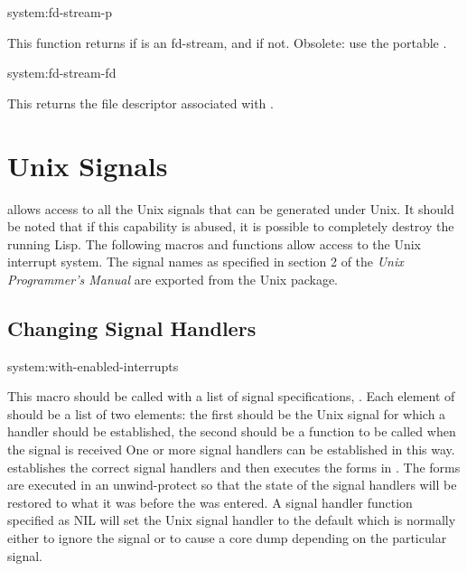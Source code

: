 \begin{defun}{system:}{fd-stream-p}{}
  
  This function returns \true{} if  is an fd-stream, and
  \nil{} if not.  Obsolete: use the portable .
\end{defun}

\begin{defun}{system:}{fd-stream-fd}{}
  
  This returns the file descriptor associated with .
\end{defun}


\section{Unix Signals}
 

\cmucl{} allows access to all the Unix signals that can be generated
under Unix.  It should be noted that if this capability is abused, it is
possible to completely destroy the running Lisp.  The following macros and
functions allow access to the Unix interrupt system.  The signal names as
specified in section 2 of the {\em Unix Programmer's Manual} are exported
from the Unix package.

\subsection{Changing Signal Handlers}
\label{signal-handlers}

\begin{defmac}{system:}{with-enabled-interrupts}{
    }
  
  This macro should be called with a list of signal specifications,
  .  Each element of  should be a list of
  two elements: the first should be the Unix signal
  for which a handler should be established, the second should be a
  function to be called when the signal is received  One or more signal handlers can be
  established in this way.   establishes
  the correct signal handlers and then executes the forms in
  .  The forms are executed in an unwind-protect so that the
  state of the signal handlers will be restored to what it was before
  the  was entered.  A signal handler
  function specified as NIL will set the Unix signal handler to the
  default which is normally either to ignore the signal or to cause a
  core dump depending on the particular signal.
\end{defmac}

